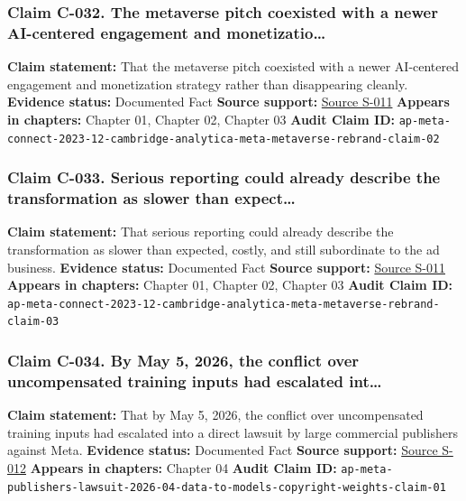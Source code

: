 \documentclass[
  american,
  11pt,
  letterpaper,
]{article}
\begin{document}
\subsubsection{Claim C-032. The metaverse pitch coexisted with a newer
AI-centered engagement and
monetizatio\ldots{}}\label{claim-c-032-the-metaverse-pitch-coexisted-with-a-newer-ai-centered-engagement-and-monetizatio}

\textbf{Claim statement:} That the metaverse pitch coexisted with a
newer AI-centered engagement and monetization strategy rather than
disappearing cleanly. \textbf{Evidence status:} Documented Fact
\textbf{Source support:}
\hyperref[source-s-011-meta-ceo-mark-zuckerberg-kicks-off-developer-conference-with-focus-on-ai-virtual-reality]{Source
S-011} \textbf{Appears in chapters:} Chapter 01, Chapter 02, Chapter 03
\textbf{Audit Claim ID:}
\texttt{ap-meta-connect-2023-12-cambridge-analytica-meta-metaverse-rebrand-claim-02}

\subsubsection{Claim C-033. Serious reporting could already describe the
transformation as slower than
expect\ldots{}}\label{claim-c-033-serious-reporting-could-already-describe-the-transformation-as-slower-than-expect}

\textbf{Claim statement:} That serious reporting could already describe
the transformation as slower than expected, costly, and still
subordinate to the ad business. \textbf{Evidence status:} Documented
Fact \textbf{Source support:}
\hyperref[source-s-011-meta-ceo-mark-zuckerberg-kicks-off-developer-conference-with-focus-on-ai-virtual-reality]{Source
S-011} \textbf{Appears in chapters:} Chapter 01, Chapter 02, Chapter 03
\textbf{Audit Claim ID:}
\texttt{ap-meta-connect-2023-12-cambridge-analytica-meta-metaverse-rebrand-claim-03}

\subsubsection{Claim C-034. By May 5, 2026, the conflict over
uncompensated training inputs had escalated
int\ldots{}}\label{claim-c-034-by-may-5-2026-the-conflict-over-uncompensated-training-inputs-had-escalated-int}

\textbf{Claim statement:} That by May 5, 2026, the conflict over
uncompensated training inputs had escalated into a direct lawsuit by
large commercial publishers against Meta. \textbf{Evidence status:}
Documented Fact \textbf{Source support:}
\hyperref[source-s-012-mark-zuckerberg-personally-authorized-meta-s-copyright-infringement-publishers-allege]{Source
S-012} \textbf{Appears in chapters:} Chapter 04 \textbf{Audit Claim ID:}
\texttt{ap-meta-publishers-lawsuit-2026-04-data-to-models-copyright-weights-claim-01}
\end{document}
